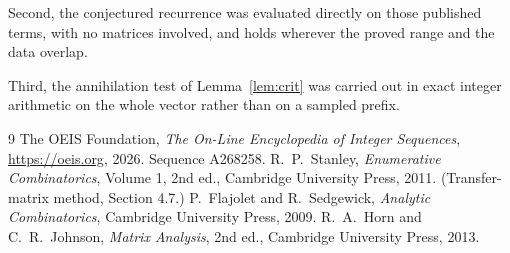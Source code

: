 \documentclass[11pt,a4paper]{article}
\theoremstyle{plain}
\theoremstyle{definition}
\begin{document}
Second, the conjectured recurrence was evaluated directly on those published terms, with no
matrices involved, and holds wherever the proved range and the data overlap.

Third, the annihilation test of Lemma~\ref{lem:crit} was carried out in exact integer
arithmetic on the whole vector rather than on a sampled prefix.

\begin{thebibliography}{9}
 The OEIS Foundation, \emph{The On-Line Encyclopedia of Integer
Sequences}, \url{https://oeis.org}, 2026. Sequence A268258.
 R.~P.~Stanley, \emph{Enumerative Combinatorics}, Volume 1, 2nd ed.,
Cambridge University Press, 2011. (Transfer-matrix method, Section 4.7.)
 P.~Flajolet and R.~Sedgewick, \emph{Analytic Combinatorics}, Cambridge
University Press, 2009.
 R.~A.~Horn and C.~R.~Johnson, \emph{Matrix Analysis}, 2nd ed., Cambridge
University Press, 2013.
\end{thebibliography}
\end{document}
